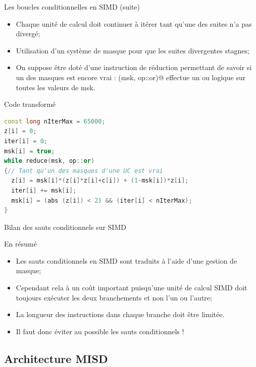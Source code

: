 \documentclass[handout]{beamer}
\begin{document}
\begin{frame}[fragile]{Les boucles conditionnelles en SIMD (suite)}

\begin{itemize}
\item Chaque unité de calcul doit continuer à itérer tant qu'une des suites n'a pas divergé;
\item Utilisation d'un système de masque pour que les suites divergentes stagnes;
\item On suppose être doté d'une instruction de réduction permettant de savoir si un des
masques est encore vrai : \lstinline@reduce(msk, op::or)@ effectue un ou logique sur toutes les
valeurs de msk.
\end{itemize}

\begin{alertblock}{Code transformé}

\begin{lstlisting}[language=C++]
const long nIterMax = 65000;
z[i] = 0;
iter[i] = 0;
msk[i] = true;
while reduce(msk, op::or) 
{// Tant qu'un des masques d'une UC est vrai
  z[i] = msk[i]*(z[i]*z[i]+c[i]) + (1-msk[i])*z[i];
  iter[i] += msk[i];
  msk[i] = (abs (z[i]) < 2) && (iter[i] < nIterMax);
}
\end{lstlisting}
\end{alertblock}
\end{frame}

\begin{frame}[fragile]{Bilan des sauts conditionnels sur SIMD}
 
 \begin{block}{En résumé}
 \begin{itemize}
  \item Les sauts conditionnels en SIMD sont traduits à l'aide d'une gestion de masque;
  \item Cependant cela à un coût important puisqu'une unité de calcul SIMD doit toujours exécuter
        les deux branchements et non l'un ou l'autre;
   \item La longueur des instructions dans chaque branche doit être limitée.
   \item Il faut donc éviter au possible les sauts conditionnels !
 \end{itemize}
 \end{block}

\end{frame}

\subsection{Architecture MISD}
\end{document}
